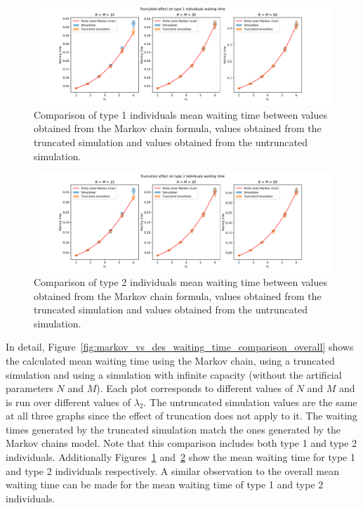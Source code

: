 \begin{figure}[H]
    \includegraphics[width=\textwidth]{chapters/03_queueing_model/img/numeric_results_and_timings/truncation_effect/waiting_time_type_1.pdf}
    \caption{
        Comparison of type 1 individuals mean waiting time between values
        obtained from the Markov chain formula, values obtained from the
        truncated simulation and values obtained from the untruncated
        simulation.
    }
    \label{fig:markov_vs_des_waiting_time_comparison_type_1}
\end{figure}

\begin{figure}[H]
    \includegraphics[width=\textwidth]{chapters/03_queueing_model/img/numeric_results_and_timings/truncation_effect/waiting_time_type_2.pdf}
    \caption{
        Comparison of type 2 individuals mean waiting time between values
        obtained from the Markov chain formula, values obtained from the
        truncated simulation and values obtained from the untruncated
        simulation.
    }
    \label{fig:markov_vs_des_waiting_time_comparison_type_2}
\end{figure}

In detail, Figure~\ref{fig:markov_vs_des_waiting_time_comparison_overall} shows
the calculated mean waiting time using the Markov chain, using a truncated
simulation and using a simulation with infinite capacity (without the artificial
parameters \(N\) and \(M\)).
Each plot corresponds to different values of \(N\) and \(M\) and is run over
different values of \(\lambda_2\).
The untruncated simulation values are the same at all three graphs since
the effect of truncation does not apply to it.
The waiting times generated by the truncated simulation match the ones generated
by the Markov chains model.
Note that this comparison includes both type 1 and type 2 individuals.
Additionally Figures~\ref{fig:markov_vs_des_waiting_time_comparison_type_1}
and~\ref{fig:markov_vs_des_waiting_time_comparison_type_2} show the mean waiting
time for type 1 and type 2 individuals respectively.
A similar observation to the overall mean waiting time can be made for the mean
waiting time of type 1 and type 2 individuals.


